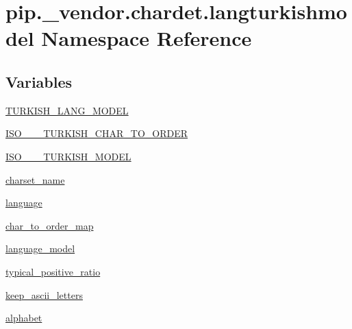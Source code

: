 \hypertarget{namespacepip_1_1__vendor_1_1chardet_1_1langturkishmodel}{}\section{pip.\+\_\+vendor.\+chardet.\+langturkishmodel Namespace Reference}
\label{namespacepip_1_1__vendor_1_1chardet_1_1langturkishmodel}
\subsection*{Variables}
\begin{DoxyCompactItemize}
\item 
\hyperlink{namespacepip_1_1__vendor_1_1chardet_1_1langturkishmodel_ac5dd782721b6f6ded1d184d3f2e78cb6}{T\+U\+R\+K\+I\+S\+H\+\_\+\+L\+A\+N\+G\+\_\+\+M\+O\+D\+EL}
\item 
\hyperlink{namespacepip_1_1__vendor_1_1chardet_1_1langturkishmodel_a6bb1089ab657212ecb07b8780785f64b}{I\+S\+O\+\_\+\_\+\_\+\+T\+U\+R\+K\+I\+S\+H\+\_\+\+C\+H\+A\+R\+\_\+\+T\+O\+\_\+\+O\+R\+D\+ER}
\item 
\hyperlink{namespacepip_1_1__vendor_1_1chardet_1_1langturkishmodel_a078c3e8875233ab66577f7596e66808a}{I\+S\+O\+\_\+\_\+\_\+\+T\+U\+R\+K\+I\+S\+H\+\_\+\+M\+O\+D\+EL}
\item 
\hyperlink{namespacepip_1_1__vendor_1_1chardet_1_1langturkishmodel_afd98948ce3bcb3aaaf795f7f9ca3ae5d}{charset\+\_\+name}
\item 
\hyperlink{namespacepip_1_1__vendor_1_1chardet_1_1langturkishmodel_ab3d1b7732d028b9435e14d11f4dce27b}{language}
\item 
\hyperlink{namespacepip_1_1__vendor_1_1chardet_1_1langturkishmodel_ae91fc433109d6eff73ca6ff1b5e21019}{char\+\_\+to\+\_\+order\+\_\+map}
\item 
\hyperlink{namespacepip_1_1__vendor_1_1chardet_1_1langturkishmodel_a35215ebd99f79aa5f552c0f3a05365da}{language\+\_\+model}
\item 
\hyperlink{namespacepip_1_1__vendor_1_1chardet_1_1langturkishmodel_a5ed69cff65440e9adaf9c97dcb0f2c3b}{typical\+\_\+positive\+\_\+ratio}
\item 
\hyperlink{namespacepip_1_1__vendor_1_1chardet_1_1langturkishmodel_a3e4ba100bb4a00ff0729e1e9f34e72ff}{keep\+\_\+ascii\+\_\+letters}
\item 
\hyperlink{namespacepip_1_1__vendor_1_1chardet_1_1langturkishmodel_a7d5f82556c8682ac63365a8c9e1f1e8c}{alphabet}
\end{DoxyCompactItemize}


